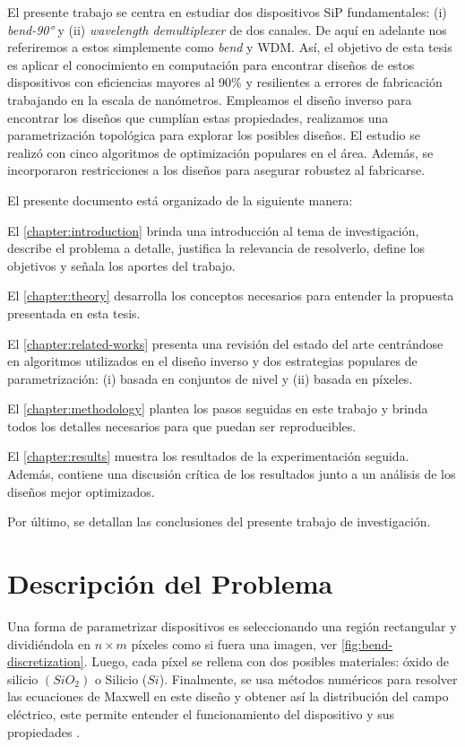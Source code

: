 El presente trabajo se centra en estudiar dos dispositivos SiP
fundamentales:
(i) \emph{bend-90°} y (ii) \emph{wavelength demultiplexer} de dos canales.
De aquí en adelante nos referiremos a estos simplemente como \emph{bend} y WDM.
Así, el objetivo de esta tesis es aplicar el conocimiento en computación para
encontrar diseños de estos dispositivos con eficiencias mayores al 90\%
y resilientes a errores de fabricación trabajando en la escala de nanómetros.
Empleamos el diseño inverso para encontrar los diseños que cumplían estas propiedades,
realizamos una parametrización topológica para explorar los posibles diseños.
El estudio se realizó con cinco algoritmos de optimización populares en el área.
Además, se incorporaron restricciones a los diseños para asegurar robustez al fabricarse.

El presente documento está organizado de la siguiente manera:

El \autoref{chapter:introduction}  brinda una introducción al tema de investigación, describe el problema a detalle, justifica la relevancia de resolverlo, define los objetivos y señala los aportes del trabajo.

El \autoref{chapter:theory} desarrolla los conceptos necesarios para entender la propuesta presentada
en esta tesis.

El \autoref{chapter:related-works} presenta una revisión del estado del arte centrándose
en algoritmos utilizados en el diseño inverso y dos estrategias populares de parametrización:
(i) basada en conjuntos de nivel y (ii) basada en píxeles.

El \autoref{chapter:methodology} plantea los pasos seguidas en este trabajo y brinda
todos los detalles necesarios para que puedan ser reproducibles.

El \autoref{chapter:results} muestra los resultados de la experimentación seguida.
Además, contiene una discusión crítica de los resultados junto a un análisis de los
diseños mejor optimizados.

Por último, se detallan las conclusiones del presente trabajo de investigación.

\section{Descripción del Problema}

Una forma de parametrizar dispositivos es seleccionando una región rectangular y dividiéndola
en $n \times m$ píxeles como si fuera una imagen, ver \autoref{fig:bend-discretization}.
Luego, cada píxel se rellena con dos posibles materiales: óxido de silicio $(SiO_2)$ o Silicio ($Si$).
Finalmente, se usa métodos numéricos para resolver las ecuaciones de Maxwell en este diseño
y obtener así la distribución del campo eléctrico, este permite entender el funcionamiento del dispositivo
y sus propiedades \citep{Molesky2018, Schneider2019}.

